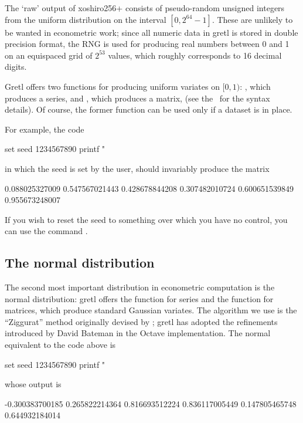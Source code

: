 The `raw' output of \textsf{xoshiro256+} consists of pseudo-random
unsigned integers from the uniform distribution on the interval
$[0, 2^{64}-1]$. These are unlikely to be wanted in econometric work;
since all numeric data in gretl is stored in double precision format,
the RNG is used for producing real numbers between 0 and 1 on an
equispaced grid of $2^{53}$ values, which roughly corresponds to 16
decimal digits.

Gretl offers two functions for producing uniform variates on
$[0,1)$: , which produces a series, and ,
which produces a matrix, (see the \GCR\ for the syntax details).  Of
course, the former function can be used only if a dataset is in place.

For example, the code
\begin{code}
  set seed 1234567890
  printf "%
\end{code}
in which the seed is set by the user, should invariably produce the
matrix
\begin{code}
  0.088025327009  0.547567021443
  0.428678844208  0.307482010724
  0.600651539849  0.955673248007
\end{code}
If you wish to reset the seed to something over which you have no
control, you can use the command .

\subsection{The normal distribution}
\label{sec:randgen-norm}

The second most important distribution in econometric computation is
the normal distribution: gretl offers the  function for
series and the  function for matrices, which produce
standard Gaussian variates. The algorithm we use is the ``Ziggurat''
method originally devised by \cite{marsaglia00}; gretl has adopted the
refinements introduced by David Bateman in the \textsf{Octave}
implementation. The normal equivalent to the code above is
\begin{code}
  set seed 1234567890
  printf "%
\end{code}
whose output is
\begin{code}
 -0.300383700185  0.265822214364
  0.816693512224  0.836117005449
  0.147805465748  0.644932184014
\end{code}

